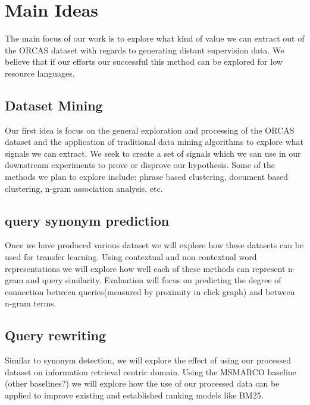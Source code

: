 \section{Main Ideas}
The main focus of our work is to explore what kind of value we can extract out of the ORCAS dataset with regards to generating distant supervision data. We believe that if our efforts our successful this method can be explored for low resource languages.
\subsection{Dataset Mining}
Our first idea is focus on the general exploration and processing of the ORCAS dataset and the application of traditional data mining algorithms to explore what signals we can extract. We seek to create a set of signals which we can use in our downstream experiments to prove or disprove our hypothesis. Some of the methods we plan to explore include: phrase based clustering, document based clustering, n-gram association analysis, etc.
\subsection{query synonym prediction}
Once we have produced various dataset we will explore how these datasets can be used for transfer learning. Using contextual and non contextual word representations we will explore how well each of these methods can represent n-gram and query similarity. Evaluation will focus on predicting the degree of connection between queries(measured by proximity in click graph) and between n-gram terms.
\subsection{Query rewriting}
Similar to synonym detection, we will explore the effect of using our processed dataset on information retrieval centric domain. Using the MSMARCO baseline (other baselines?) we will explore how the use of our processed data can be applied to improve existing and established ranking models like BM25.  